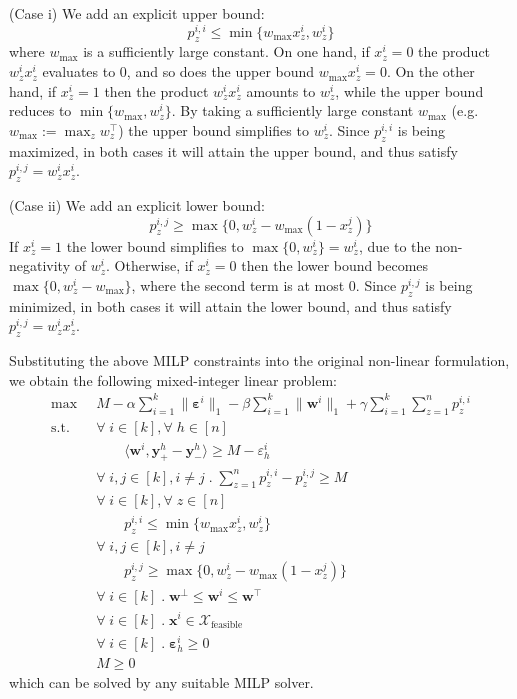 \documentclass{article}
\renewcommand\[{\begin{equation}}
\renewcommand\]{\end{equation}}
\newcommand{\calvar}[1]{\ensuremath{\mathcal{#1}}}
\newcommand{\calX}{\calvar{X}}
\newcommand{\vecvar}[1]{\ensuremath{\boldsymbol{#1}}}
\newcommand{\vw}{\vecvar{w}}
\newcommand{\vx}{\vecvar{x}}
\newcommand{\vy}{\vecvar{y}}
\newcommand{\veps}{\vecvar{\varepsilon}}
\begin{document}
(Case i) We add an explicit upper bound:
%
$$ p^{i,i}_z \le \min \{ w_\text{max} x^{i}_z, w^{i}_z \} $$
%
where $w_\text{max}$ is a sufficiently large constant.
On one hand, if $x^i_z = 0$ the product $w^i_z x^i_z$ evaluates to $0$, and so does
the upper bound $w_\text{max} x^{i}_z = 0$. On the other hand, if $x^i_z=1$
then the product $w^i_z x^i_z$ amounts to $w^i_z$, while the upper
bound reduces to $\min \{ w_\text{max}, w^{i}_z \}$. By taking a sufficiently
large constant $w_\text{max}$ (e.g. $w_\text{max} := \max_z w^\top_z$) the
upper bound simplifies to $w^i_z$. Since $p^{i,i}_z$ is being maximized, in
both cases it will attain the upper bound, and thus satisfy $p^{i,j}_z = w^i_z x^i_z$.

(Case ii) We add an explicit lower bound:
%
$$ p^{i,j}_z \ge \max \{ 0, w^{i}_z - w_\text{max}(1 - x^{j}_z) \} $$
%
If $x^i_z = 1$ the lower bound simplifies to $\max \{ 0, w^{i}_z \} = w^{i}_z$,
due to the non-negativity of $w^i_z$. Otherwise, if $x^i_z = 0$
then the lower bound becomes $\max \{ 0, w^{i}_z - w_\text{max} \}$, where
the second term is at most $0$. Since $p^{i,j}_z$ is being minimized, in both
cases it will attain the lower bound, and thus satisfy $p^{i,j}_z = w^i_z x^i_z$.

Substituting the above MILP constraints into the original non-linear
formulation, we obtain the following mixed-integer linear problem:
%
{\footnotesize
\begin{align}
    \max
        & \;\; M - \alpha \sum_{i=1}^k \| \veps^{i} \|_1 - \beta \sum_{i=1}^k \| \vw^{i} \|_1 + \gamma \sum_{i=1}^k \sum_{z=1}^n p^{i,i}_z
        \nonumber
    \\
    \text{s.t.}
        & \;\; \forall \; i \in [k], \forall \; h \in [n] \nonumber
    \\
        & \;\; \qquad \langle \vw^{i}, \vy^{h}_+ - \vy^{h}_- \rangle \ge M - \varepsilon^{i}_h \nonumber
    \\
        & \;\; \forall \; i, j \in [k], i \neq j \;.\; \sum_{z=1}^n p^{i,i}_z - p^{i,j}_z \ge M
    \\
        & \;\; \forall \; i \in [k], \forall \; z \in [n] \nonumber
    \\
        & \;\; \qquad p^{i,i}_z \le \min \{ w_\text{max} x^{i}_z, w^{i}_z \}
    \\
        & \;\; \forall \; i, j \in [k], i \neq j \nonumber
    \\
        & \;\; \qquad p^{i,j}_z \ge \max \{ 0, w^{i}_z - w_\text{max}(1 - x^{j}_z) \}
    \\
        & \;\; \forall \; i \in [k] \;.\; \vw^\bot \le \vw^{i} \le \vw^\top \nonumber
    \\
        & \;\; \forall \; i \in [k] \;.\; \vx^{i} \in \calX_{\text{feasible}} \nonumber
    \\
        & \;\; \forall \; i \in [k] \;.\; \veps^{i}_h \ge 0 \nonumber
    \\
        & \;\; M \ge 0 \nonumber
\end{align}
}
%
which can be solved by any suitable MILP solver.
\end{document}
